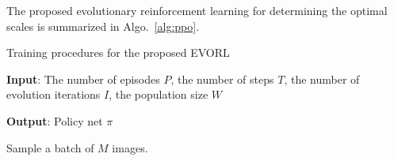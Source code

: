 \documentclass[letterpaper]{article} %
\newcommand\rjf[1]{\textcolor{red}{\{RJF: #1\}}}
\begin{document}

The proposed evolutionary reinforcement learning for determining the optimal scales is summarized in Algo.~\ref{alg:ppo}.


\begin{algorithm}[ht]
\caption{Training procedures for the proposed EVORL}%
\label{alg:ppo}
\textbf{Input}:
The number of episodes $P$,
the number of steps $T$,
the number of evolution iterations $I$,
the population size $W$

\textbf{Output}: Policy net $\pi$
\begin{algorithmic}[1]

  \STATE Sample a batch of $M$ images.


\end{algorithmic}
\end{algorithm}
\end{document}
